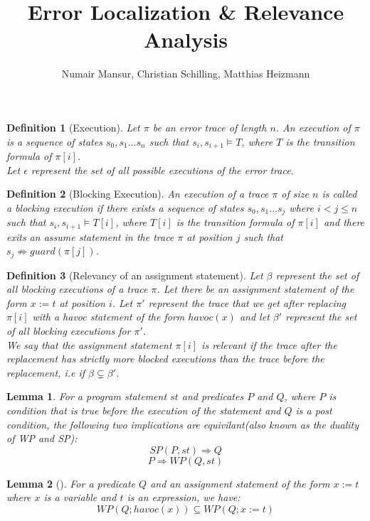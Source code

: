 \documentclass{article}
\title{Error Localization \& Relevance Analysis \\ }
\author{Numair Mansur, Christian Schilling, Matthias Heizmann}
\affil{University of Freiburg, Germany}
\date{\vspace{-5ex}}
\newcommand{\limp}{\Rightarrow}
\newtheorem{mydef}{Definition}
\newtheorem{lemma}{Lemma}
\begin{document}
\maketitle
\begin{mydef}[Execution]\label{mydef:execution_definition}
Let $\pi$ be an error trace of length $n$. An execution of $\pi$ is a sequence of states $s_0, s_1...s_n$ such that $s_i, s_{i+1} \models T$, where $T$ is the transition formula of $\pi[i]$. \\
Let $\epsilon$ represent the set of all possible executions of the error trace.
\end{mydef}

\begin{mydef}[Blocking Execution]\label{mydef:blockingexecution_definition}
An execution of a trace $\pi$ of size $n$ is called a blocking execution if there exists a sequence of states $s_0, s_1...s_j$ where $i<j \leq n$ such that $s_i, s_{i+1} \models T[i]$, where $T[i]$ is the transition formula of $\pi[i]$ and there exits an assume statement in the trace $\pi$ at position $j$ such that $s_{j} \not \limp guard(\pi[j])$.
\end{mydef}

\begin{mydef}[Relevancy of an assignment statement]\label{mydef:relevancy_definition}
Let $\beta$ represent the set of all blocking executions of a trace $\pi$. Let there be an assignment statement of the form $x:=t$ at position $i$. Let $\pi'$ represent the trace that we get after replacing $\pi[i]$ with a havoc statement of the form $havoc(x)$ and let $\beta'$ represent the set of all blocking executions for $\pi'$.\\
We say that the assignment statement $\pi[i]$ is relevant if the trace after the replacement has strictly more blocked executions than the trace before the replacement, i.e if $\beta \subsetneq \beta'$. 
\end{mydef}

\begin{lemma}\label{lemma:duality}
For a program statement $st$ and predicates $P$ and $Q$, where $P$ is condition that is true before the execution of the statement and $Q$ is a post condition, the following two implications are equivilant(also known as the duality of WP and SP):
$$SP(P,st) \Rightarrow Q$$
$$P \Rightarrow WP(Q,st)$$
\end{lemma}

\begin{lemma}[]\label{lemma:rel_bw_assignment_and_havoc}
For a predicate $Q$ and an assignment statement of the form $x:=t$ where $x$ is a variable and $t$ is an expression, we have:
$$WP(Q; havoc(x)) \subseteq WP(Q; x:=t)$$
\end{lemma}
\end{document}
